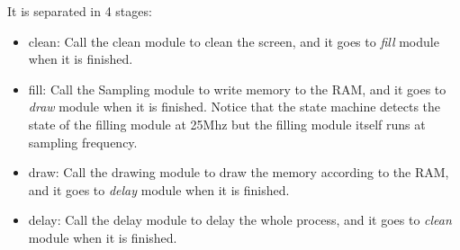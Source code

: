 \documentclass[11pt]{scrartcl}
\begin{document}
It is separated in 4 stages:
\begin{itemize}
    \item clean:
    Call the clean module to clean the screen, and it goes to \textit{fill} module when it is finished.
    \item fill:
    Call the Sampling module to write memory to the RAM, and it goes to \textit{draw} module when it is finished. Notice that the state machine detects the state of the filling module at 25Mhz but the filling module itself runs at sampling frequency.
    \item draw:
    Call the drawing module to draw the memory according to the RAM, and it goes to \textit{delay} module when it is finished.
    \item delay:
    Call the delay module to delay the whole process, and it goes to \textit{clean} module when it is finished.
\end{itemize}
\end{document}
